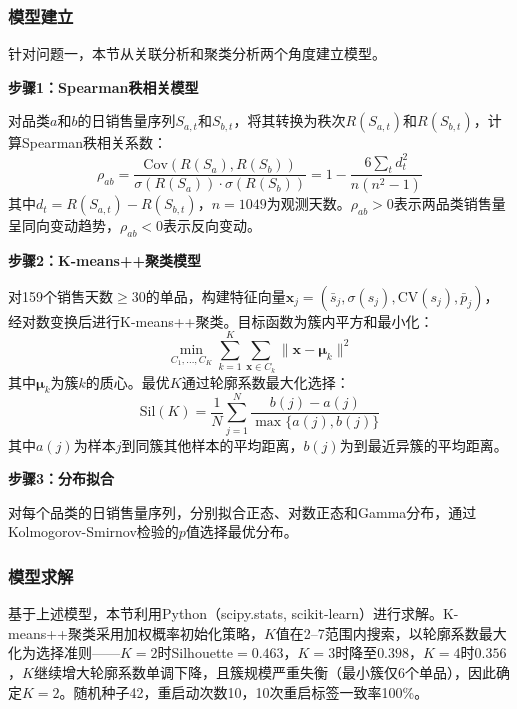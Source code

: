 
\subsubsection{模型建立}

针对问题一，本节从关联分析和聚类分析两个角度建立模型。

\textbf{步骤1：Spearman秩相关模型}

对品类$a$和$b$的日销售量序列$S_{a,t}$和$S_{b,t}$，将其转换为秩次$R(S_{a,t})$和$R(S_{b,t})$，计算Spearman秩相关系数：
\begin{equation}
  \rho_{ab} = \frac{\text{Cov}(R(S_a), R(S_b))}{\sigma(R(S_a)) \cdot \sigma(R(S_b))} = 1 - \frac{6\sum_t d_t^2}{n(n^2-1)}
\end{equation}
其中$d_t = R(S_{a,t}) - R(S_{b,t})$，$n=1049$为观测天数。$\rho_{ab}>0$表示两品类销售量呈同向变动趋势，$\rho_{ab}<0$表示反向变动。

\textbf{步骤2：K-means++聚类模型}

对159个销售天数$\geq 30$的单品，构建特征向量$\mathbf{x}_j = (\bar{s}_j, \sigma(s_j), \text{CV}(s_j), \bar{p}_j)$，经对数变换后进行K-means++聚类。目标函数为簇内平方和最小化：
\begin{equation}
  \min_{C_1,\ldots,C_K} \sum_{k=1}^{K} \sum_{\mathbf{x} \in C_k} \|\mathbf{x} - \boldsymbol{\mu}_k\|^2
\end{equation}
其中$\boldsymbol{\mu}_k$为簇$k$的质心。最优$K$通过轮廓系数最大化选择：
\begin{equation}
  \text{Sil}(K) = \frac{1}{N}\sum_{j=1}^{N} \frac{b(j) - a(j)}{\max\{a(j), b(j)\}}
\end{equation}
其中$a(j)$为样本$j$到同簇其他样本的平均距离，$b(j)$为到最近异簇的平均距离。

\textbf{步骤3：分布拟合}

对每个品类的日销售量序列，分别拟合正态、对数正态和Gamma分布，通过Kolmogorov-Smirnov检验的$p$值选择最优分布。

\subsubsection{模型求解}

基于上述模型，本节利用Python（scipy.stats, scikit-learn）进行求解。K-means++聚类采用加权概率初始化策略\cite{Arthur2007}，$K$值在2--7范围内搜索，以轮廓系数最大化为选择准则——$K=2$时Silhouette$=0.463$，$K=3$时降至$0.398$，$K=4$时$0.356$，$K$继续增大轮廓系数单调下降，且簇规模严重失衡（最小簇仅6个单品），因此确定$K=2$。随机种子42，重启动次数10，10次重启标签一致率100\%。

